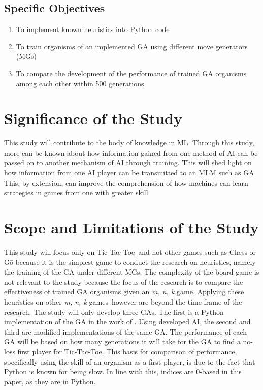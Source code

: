 \documentclass{strrespaper-trad}
\newcommand{\mnk}{\textit{m, n, k} game}
\newcommand{\mnkpl}{\textit{m, n, k} games}
\newcommand{\ttt}{Tic-Tac-Toe}
\begin{document}
			\subsection{Specific Objectives}
				\begin{enumerate}
					\item To implement known heuristics into Python code
					\item To train organisms of an implemented GA using different move generators (MGs)
					\item To compare the development of the performance of trained GA organisms among each other within 500 generations
				\end{enumerate}

		\section{Significance of the Study}
			This study will contribute to the body of knowledge in ML.
			Through this study, more can be known about how information gained from one method of AI can be passed on to another mechanism of AI through training.
			This will shed light on how information from one AI player can be transmitted to an MLM such as GA.
			This, by extension, can improve the comprehension of how machines can learn strategies in games from one with greater skill.

		\section{Scope and Limitations of the Study}
			This study will focus only on \ttt\ and not other games such as Chess or G\=o because it is the simplest game to conduct the research on heuristics, namely the training of the GA under different MGs.
			The complexity of the board game is not relevant to the study because the focus of the research is to compare the effectiveness of trained GA organisms given an \mnk.
			Applying these heuristics on other \mnkpl\ however are beyond the time frame of the research.
			The study will only develop three GAs.
			The first is a Python implementation of the GA in the work of \textcite{bhattSearchNolossStrategies2008}.
			Using developed AI, the second and third are modified implementations of the same GA.
			The performance of each GA will be based on how many generations it will take for the GA to find a no-loss first player for \ttt.
			This basis for comparison of performance, specifically using the skill of an organism as a first player, is due to the fact that Python is known for being slow.
			In line with this, indices are 0-based in this paper, as they are in Python.
\end{document}
